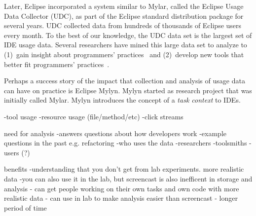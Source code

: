 Later, Eclipse incorporated a system similar to Mylar, called the Eclipse Usage
Data Collector (UDC), as part of the Eclipse standard
distribution package for several years. UDC collected data from hundreds of
thousands of Eclipse users every month. To the best of our knowledge, the UDC
data set is the largest set of IDE usage data.
Several researchers have mined this large data set to analyze to 
%
(1)~gain insight about programmers'
practices~\cite{VakilianJohnson2014Alternate, VakilianETAL2013Compositional,
V:MurphyHill2012How} and
%
(2)~develop new tools that better fit programmers'
practices~\cite{MurphyHill2012Improving, VakilianETAL2013Compositional,
Kersten-Mylar2005}.

Perhaps a success story of the impact that collection and analysis of usage data
can have on practice is Eclipse Mylyn. Mylyn started as research project that
was initially called Mylar. Mylyn introduces the concept of a \emph{task
context} to IDEs.


	-tool usage
	-resource usage (file/method/etc)
	-click streams

need for analysis
	-answers questions about how developers work
	-example questions in the past e.g. refactoring
	-who uses the data
		-researchers
		-toolsmiths
		-users (?)

benefits
	-understanding that you don't get from lab experiments. more realistic data
	-you can also use it in the lab, but screencast is also inefficent in storage and analysis
		- can get people working on their own tasks and own code with more realistic data
		- can use in lab to make analysis easier than screencast
		- longer period of time


